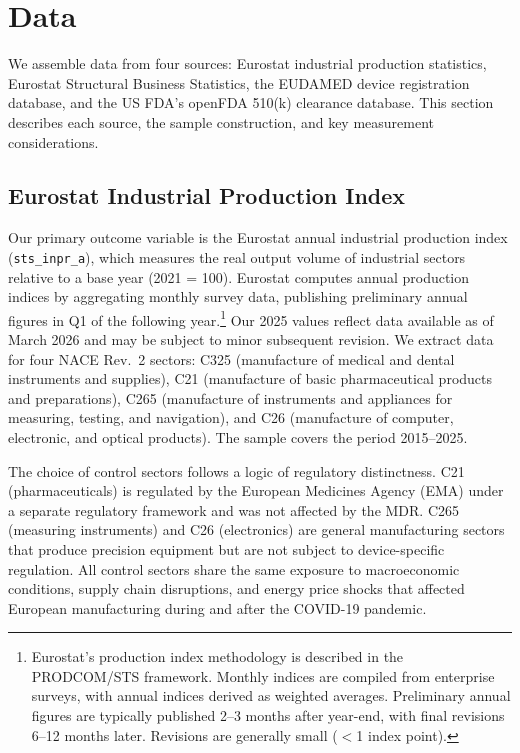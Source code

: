 \documentclass[12pt]{article}
\begin{document}

\section{Data}
\label{sec:data}

We assemble data from four sources: Eurostat industrial production statistics, Eurostat Structural Business Statistics, the EUDAMED device registration database, and the US FDA's openFDA 510(k) clearance database. This section describes each source, the sample construction, and key measurement considerations.

\subsection{Eurostat Industrial Production Index}

Our primary outcome variable is the Eurostat annual industrial production index (\texttt{sts\_inpr\_a}), which measures the real output volume of industrial sectors relative to a base year (2021 = 100). Eurostat computes annual production indices by aggregating monthly survey data, publishing preliminary annual figures in Q1 of the following year.\footnote{Eurostat's production index methodology is described in the PRODCOM/STS framework. Monthly indices are compiled from enterprise surveys, with annual indices derived as weighted averages. Preliminary annual figures are typically published 2--3 months after year-end, with final revisions 6--12 months later. Revisions are generally small ($<$1 index point).} Our 2025 values reflect data available as of March 2026 and may be subject to minor subsequent revision. We extract data for four NACE Rev.\ 2 sectors: C325 (manufacture of medical and dental instruments and supplies), C21 (manufacture of basic pharmaceutical products and preparations), C265 (manufacture of instruments and appliances for measuring, testing, and navigation), and C26 (manufacture of computer, electronic, and optical products). The sample covers the period 2015--2025.

The choice of control sectors follows a logic of regulatory distinctness. C21 (pharmaceuticals) is regulated by the European Medicines Agency (EMA) under a separate regulatory framework and was not affected by the MDR. C265 (measuring instruments) and C26 (electronics) are general manufacturing sectors that produce precision equipment but are not subject to device-specific regulation. All control sectors share the same exposure to macroeconomic conditions, supply chain disruptions, and energy price shocks that affected European manufacturing during and after the COVID-19 pandemic.
\end{document}
